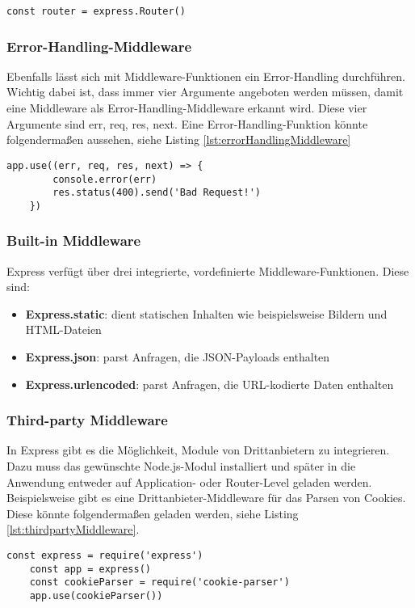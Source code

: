 \begin{lstlisting}[caption={Verwendung der Instanz}, label={lst:verwendungInstanz}]
    const router = express.Router()
\end{lstlisting}

\subsubsection{Error-Handling-Middleware}

Ebenfalls lässt sich mit Middleware-Funktionen ein Error-Handling durchführen. Wichtig dabei ist, dass immer vier Argumente angeboten werden müssen, damit eine Middleware als Error-Handling-Middleware erkannt wird. Diese vier Argumente sind \glqq err, req, res, next\grqq{}. 
Eine Error-Handling-Funktion könnte folgendermaßen aussehen, siehe Listing \ref*{lst:errorHandlingMiddleware}

\begin{lstlisting}[caption={Error-Handling-Middleware}, label={lst:errorHandlingMiddleware}]
    app.use((err, req, res, next) => {
	    console.error(err)
	    res.status(400).send('Bad Request!')
    })
\end{lstlisting}


\subsubsection{Built-in Middleware}

Express verfügt über drei integrierte, vordefinierte Middleware-Funktionen. Diese sind:
\begin{itemize}
    \item \textbf{Express.static}: dient statischen Inhalten wie beispielsweise Bildern und HTML-Dateien
    \item \textbf{Express.json}: parst Anfragen, die JSON-Payloads enthalten
    \item \textbf{Express.urlencoded}: parst Anfragen, die URL-kodierte Daten enthalten
\end{itemize}

\subsubsection{Third-party Middleware}

In Express gibt es die Möglichkeit, Module von Drittanbietern zu integrieren. Dazu muss das gewünschte Node.js-Modul installiert und später in die Anwendung entweder auf Application- oder Router-Level geladen werden. Beispielsweise gibt es eine Drittanbieter-Middleware für das Parsen von Cookies. Diese könnte folgendermaßen geladen werden, siehe Listing \ref*{lst:thirdpartyMiddleware}.

\begin{lstlisting}[caption={Module von Drittanbietern integrieren \cite{nsechs}}, label={lst:thirdpartyMiddleware}]
    const express = require('express')
    const app = express()
    const cookieParser = require('cookie-parser')
    app.use(cookieParser())
\end{lstlisting}


